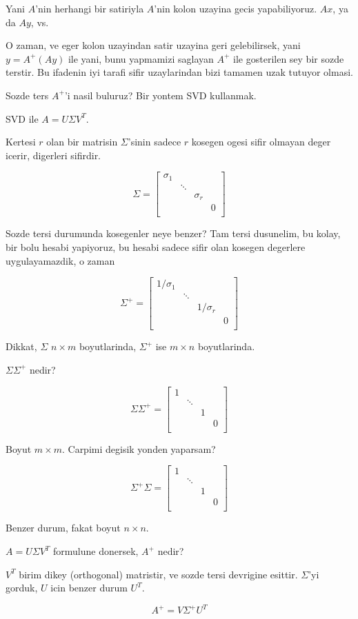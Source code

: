 \documentclass[12pt,fleqn]{article}\usepackage{../common}
\begin{document}
Yani $A$'nin herhangi bir satiriyla $A$'nin kolon uzayina gecis
yapabiliyoruz. $Ax$, ya da $Ay$, vs. 

O zaman, ve eger kolon uzayindan satir uzayina geri gelebilirsek, 
yani $y = A^{+}(Ay)$ ile yani, bunu yapmamizi saglayan $A^{+}$ ile
gosterilen  sey bir sozde terstir. Bu ifadenin iyi tarafi sifir 
uzaylarindan bizi tamamen uzak tutuyor olmasi.

Sozde ters $A^{+}$'i nasil buluruz? Bir yontem SVD kullanmak.

SVD ile $A = U \Sigma V^T$. 

Kertesi $r$ olan bir matrisin $\Sigma$'sinin sadece $r$ kosegen ogesi sifir
olmayan deger icerir, digerleri sifirdir.

$$ 
\Sigma = 
\left[\begin{array}{cccc}
\sigma_1 & & & \\
 & \ddots & & \\
 &  & \sigma_r & \\
 &  &  & 0 \\
\end{array}\right]
 $$

Sozde tersi durumunda kosegenler neye benzer? Tam tersi dusunelim, bu
kolay, bir bolu hesabi yapiyoruz, bu hesabi sadece sifir olan kosegen
degerlere uygulayamazdik, o zaman

$$ 
\Sigma^{+} = 
\left[\begin{array}{cccc}
1/\sigma_1 & & & \\
 & \ddots & & \\
 &  & 1/\sigma_r & \\
 &  &  & 0 \\
\end{array}\right]
 $$

Dikkat, $\Sigma$ $n \times m$ boyutlarinda, $\Sigma^{+}$ ise $m \times n$ boyutlarinda. 

$\Sigma \Sigma^{+}$ nedir? 


$$ \Sigma \Sigma^{+} =  
\left[\begin{array}{cccc}
1 & & & \\
 & \ddots & & \\
 &  & 1 & \\
 &  &  & 0 \\
\end{array}\right]
$$

Boyut $m \times m$. Carpimi degisik yonden yaparsam? 

$$ \Sigma^{+}\Sigma  =  
\left[\begin{array}{cccc}
1 & & & \\
 & \ddots & & \\
 &  & 1 & \\
 &  &  & 0 \\
\end{array}\right]
$$

Benzer durum, fakat boyut $n \times n$. 

$A = U \Sigma V^T$ formulune donersek, $A^{+}$ nedir? 

$V^{T}$ birim dikey (orthogonal) matristir, ve sozde tersi devrigine
esittir. $\Sigma$'yi gorduk, $U$ icin benzer durum $U^T$. 

$$ A^{+} =  V \Sigma^{+} U^T$$
\end{document}
